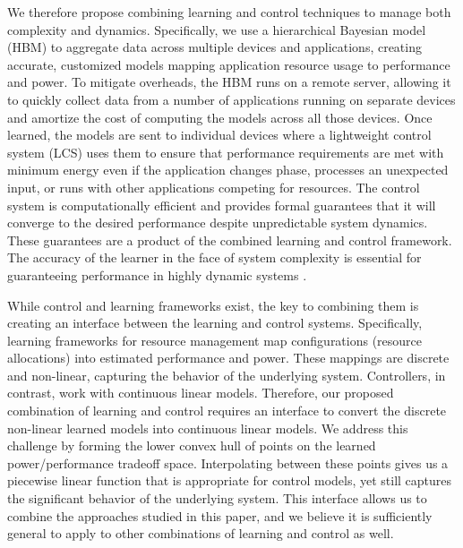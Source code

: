 We therefore propose combining learning and control techniques to
manage both complexity and dynamics.  Specifically, we use a
hierarchical Bayesian model (HBM) to aggregate data across multiple
devices and applications, creating accurate, customized models mapping
application resource usage to performance and power.  To mitigate
overheads, the HBM runs on a remote server, allowing it to quickly
collect data from a number of applications running on separate devices
and amortize the cost of computing the models across all those
devices.  Once learned, the models are sent to individual devices
where a lightweight control system (LCS) uses them to ensure that
performance requirements are met with minimum energy even if the
application changes phase, processes an unexpected input, or runs with
other applications competing for resources.  The control system is
computationally efficient and provides formal guarantees that it will
converge to the desired performance despite unpredictable system
dynamics.  These guarantees are a product of the combined learning and
control framework.  The accuracy of the learner in the face of system
complexity is essential for guaranteeing performance in highly dynamic
systems .

While control and learning frameworks exist, the key to combining them
is creating an interface between the learning and control systems.
Specifically, learning frameworks for resource management map
configurations (\eg resource allocations) into estimated performance
and power.  These mappings are discrete and non-linear, capturing the
behavior of the underlying system.  Controllers, in contrast, work
with continuous linear models.  Therefore, our proposed combination of
learning and control requires an interface to convert the discrete
non-linear learned models into continuous linear models.  We address
this challenge by forming the lower convex hull of points on the
learned power/performance tradeoff space.  Interpolating between these
points gives us a piecewise linear function that is appropriate for
control models, yet still captures the significant behavior of the
underlying system.  This interface allows us to combine the approaches
studied in this paper, and we believe it is sufficiently general to
apply to other combinations of learning and control as well.

